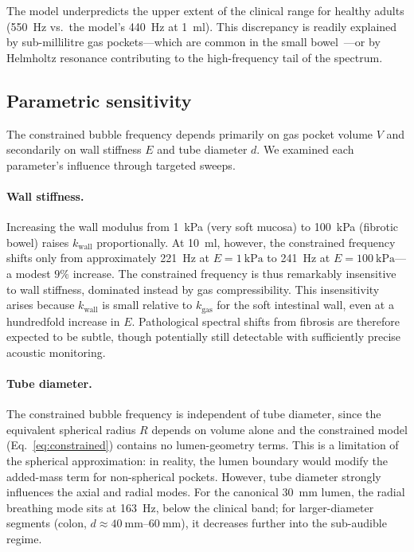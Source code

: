 \documentclass[review]{elsarticle}
\begin{document}
The model underpredicts the upper extent of the clinical range for healthy
adults (\SI{550}{\hertz} vs.\ the model's \SI{440}{\hertz} at
\SI{1}{\milli\litre}).  This discrepancy is readily explained by sub-millilitre
gas pockets---which are common in the small bowel~\cite{Levitt1971}---or by
Helmholtz resonance contributing to the high-frequency tail of the spectrum.

\subsection{Parametric sensitivity}
\label{sec:sensitivity}

The constrained bubble frequency depends primarily on gas pocket volume $V$
and secondarily on wall stiffness $E$ and tube diameter $d$.  We examined
each parameter's influence through targeted sweeps.

\paragraph{Wall stiffness.}
Increasing the wall modulus from \SI{1}{\kilo\pascal} (very soft mucosa) to
\SI{100}{\kilo\pascal} (fibrotic bowel) raises $k_\mathrm{wall}$
proportionally.  At \SI{10}{\milli\litre}, however, the constrained frequency
shifts only from approximately \SI{221}{\hertz} at $E = \SI{1}{\kilo\pascal}$
to \SI{241}{\hertz} at $E = \SI{100}{\kilo\pascal}$---a modest $9\%$ increase.
The constrained frequency is thus remarkably insensitive to wall stiffness,
dominated instead by gas compressibility.  This insensitivity arises because
$k_\mathrm{wall}$ is small relative to $k_\mathrm{gas}$ for the soft
intestinal wall, even at a hundredfold increase in $E$.  Pathological spectral
shifts from fibrosis are therefore expected to be subtle, though potentially
still detectable with sufficiently precise acoustic monitoring.

\paragraph{Tube diameter.}
The constrained bubble frequency is independent of tube diameter, since
the equivalent spherical radius $R$ depends on volume alone and the
constrained model (Eq.~\ref{eq:constrained}) contains no lumen-geometry
terms.  This is a limitation of the spherical approximation: in reality,
the lumen boundary would modify the added-mass term for non-spherical
pockets.  However, tube
diameter strongly influences the axial and radial modes.  For the canonical
\SI{30}{\milli\metre} lumen, the radial breathing mode sits at
\SI{163}{\hertz}, below the clinical band; for larger-diameter segments
(colon, $d \approx \SIrange{40}{60}{\milli\metre}$), it decreases further
into the sub-audible regime.
\end{document}
